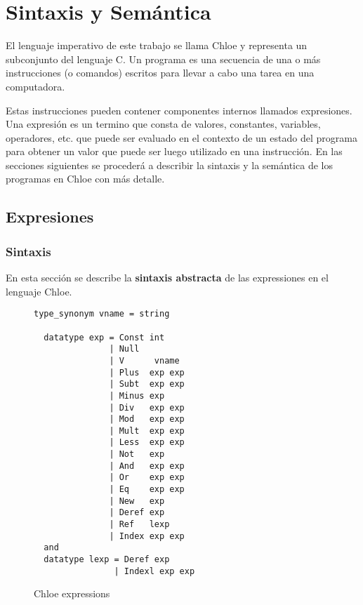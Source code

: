 \chapter{Sintaxis y Semántica}\label{chapter:semantics}

El lenguaje imperativo de este trabajo se llama Chloe y representa un subconjunto del lenguaje C.
Un programa es una secuencia de una o más instrucciones (o comandos) escritos para llevar a cabo una tarea en una computadora.
\begin{comment}
Cada una de estas instrucciones representa una instrucción que la máquina ejecutará.
\end{comment}
Estas instrucciones pueden contener componentes internos llamados expresiones.
Una expresión es un termino que consta de valores, constantes, variables, operadores, etc. que puede ser evaluado en el contexto de un estado del programa para obtener un valor que puede ser luego utilizado en una instrucción.
En las secciones siguientes se procederá a describir la sintaxis y la semántica de los programas en Chloe con más detalle.


\section{Expresiones}\label{section:expressions}

\subsection{Sintaxis}\label{subsection:syntax_expressions}

En esta sección se describe la \textbf{sintaxis abstracta} de las expressiones en el lenguaje Chloe.

\begin{figure}
  \begin{lstlisting}[frame=single]
  type_synonym vname = string

  datatype exp = Const int
               | Null
               | V      vname
               | Plus  exp exp
               | Subt  exp exp
               | Minus exp
               | Div   exp exp
               | Mod   exp exp
               | Mult  exp exp
               | Less  exp exp
               | Not   exp
               | And   exp exp
               | Or    exp exp
               | Eq    exp exp
               | New   exp
               | Deref exp
               | Ref   lexp
               | Index exp exp
  and
  datatype lexp = Deref exp
                | Indexl exp exp
  \end{lstlisting}

  \caption{Chloe expressions}
  \label{fig:chloe_expressions}
\end{figure}

